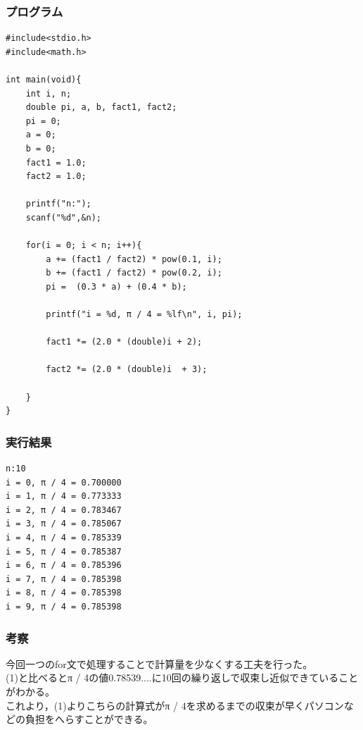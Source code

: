 \documentclass{jarticle}
\begin{document}
\subsubsection{プログラム\\}
\begin{breakbox}
\begin{verbatim}
#include<stdio.h>
#include<math.h>

int main(void){
    int i, n;
    double pi, a, b, fact1, fact2;
    pi = 0;
    a = 0;
    b = 0;
    fact1 = 1.0;
    fact2 = 1.0;

    printf("n:");
	scanf("%d",&n);

    for(i = 0; i < n; i++){
        a += (fact1 / fact2) * pow(0.1, i);
        b += (fact1 / fact2) * pow(0.2, i);
        pi =  (0.3 * a) + (0.4 * b);

        printf("i = %d, π / 4 = %lf\n", i, pi);

        fact1 *= (2.0 * (double)i + 2); 

        fact2 *= (2.0 * (double)i  + 3);

    }
}
\end{verbatim}
\end{breakbox}

\subsubsection{実行結果\\}
\begin{breakbox}
\begin{verbatim}
n:10
i = 0, π / 4 = 0.700000
i = 1, π / 4 = 0.773333
i = 2, π / 4 = 0.783467
i = 3, π / 4 = 0.785067
i = 4, π / 4 = 0.785339
i = 5, π / 4 = 0.785387
i = 6, π / 4 = 0.785396
i = 7, π / 4 = 0.785398
i = 8, π / 4 = 0.785398
i = 9, π / 4 = 0.785398
\end{verbatim}
\end{breakbox}
\subsubsection{考察\\}
今回一つのfor文で処理することで計算量を少なくする工夫を行った。\\
(1)と比べるとπ / 4の値0.78539....に10回の繰り返しで収束し近似できていることがわかる。\\
これより，(1)よりこちらの計算式がπ / 4を求めるまでの収束が早くパソコンなどの負担をへらすことができる。\\
\end{document}
